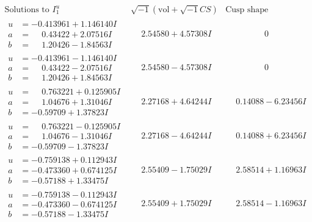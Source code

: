 \documentclass[1p]{elsarticle_modified}
\theoremstyle{definition}
\newcommand{\I}{\sqrt{-1}}
\begin{document}
$$\begin{array}{c|c|c}
\text{Solutions to }I^u_{1}& \I (\text{vol} + \sqrt{-1}CS) & \text{Cusp shape}\\
 \hline 
\begin{aligned}
u &= -0.413961 + 1.146140 I \\
a &= \phantom{-}0.43422 + 2.07516 I \\
b &= \phantom{-}1.20426 - 1.84563 I\end{aligned}
 & \phantom{-}2.54580 + 4.57308 I & \phantom{-0.000000 } 0 \\ \hline\begin{aligned}
u &= -0.413961 - 1.146140 I \\
a &= \phantom{-}0.43422 - 2.07516 I \\
b &= \phantom{-}1.20426 + 1.84563 I\end{aligned}
 & \phantom{-}2.54580 - 4.57308 I & \phantom{-0.000000 } 0 \\ \hline\begin{aligned}
u &= \phantom{-}0.763221 + 0.125905 I \\
a &= \phantom{-}1.04676 + 1.31046 I \\
b &= -0.59709 + 1.37823 I\end{aligned}
 & \phantom{-}2.27168 + 4.64244 I & \phantom{-}0.14088 - 6.23456 I \\ \hline\begin{aligned}
u &= \phantom{-}0.763221 - 0.125905 I \\
a &= \phantom{-}1.04676 - 1.31046 I \\
b &= -0.59709 - 1.37823 I\end{aligned}
 & \phantom{-}2.27168 - 4.64244 I & \phantom{-}0.14088 + 6.23456 I \\ \hline\begin{aligned}
u &= -0.759138 + 0.112943 I \\
a &= -0.473360 + 0.674125 I \\
b &= -0.57188 + 1.33475 I\end{aligned}
 & \phantom{-}2.55409 - 1.75029 I & \phantom{-}2.58514 + 1.16963 I \\ \hline\begin{aligned}
u &= -0.759138 - 0.112943 I \\
a &= -0.473360 - 0.674125 I \\
b &= -0.57188 - 1.33475 I\end{aligned}
 & \phantom{-}2.55409 + 1.75029 I & \phantom{-}2.58514 - 1.16963 I \\ \hline\begin{aligned}

\end{aligned}
\end{array}$$
\end{document}

